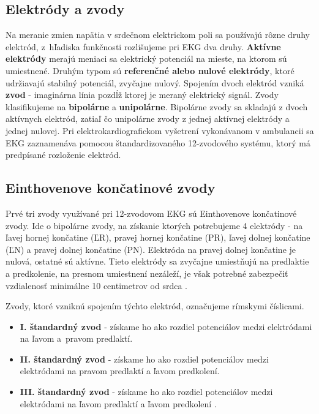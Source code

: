 \subsection{Elektródy a zvody}

Na meranie zmien napätia v srdečnom elektrickom poli sa používajú rôzne druhy elektród, z~hľadiska funkčnosti rozlišujeme pri EKG dva druhy. \textbf{Aktívne elektródy} merajú meniaci sa elektrický potenciál na mieste, na ktorom sú umiestnené. Druhým typom sú \textbf{referenčné alebo nulové elektródy}, ktoré udržiavajú stabilný potenciál, zvyčajne nulový. Spojením dvoch elektród vzniká \textbf{zvod} - imaginárna línia pozdĺž ktorej je meraný elektrický signál. Zvody klasifikujeme na \textbf{bipolárne} a \textbf{unipolárne}. Bipolárne zvody sa skladajú z dvoch aktívnych elektród, zatiaľ čo unipolárne zvody z jednej aktívnej elektródy a jednej nulovej. Pri elektrokardiografickom vyšetrení vykonávanom v ambulancii sa EKG zaznamenáva pomocou štandardizovaného 12-zvodového systému, ktorý má predpísané rozloženie elektród.

\subsection{Einthovenove končatinové zvody}

Prvé tri zvody využívané pri 12-zvodovom EKG sú Einthovenove končatinové zvody. Ide o bipolárne zvody, na získanie ktorých potrebujeme 4 elektródy - na ľavej hornej končatine (ĽR), pravej hornej končatine (PR), ľavej dolnej končatine (ĽN) a pravej dolnej končatine (PN). Elektróda na pravej dolnej končatine je nulová, ostatné sú aktívne. Tieto elektródy sa zvyčajne umiestňujú na predlaktie a predkolenie, na presnom umiestnení nezáleží, je však potrebné zabezpečiť vzdialenosť minimálne 10 centimetrov od srdca \cite{garcia201512}.

\noindent Zvody, ktoré vzniknú spojením týchto elektród, označujeme rímskymi číslicami.

\begin{itemize}
    \item \textbf{I. štandardný zvod} - získame ho ako rozdiel potenciálov medzi elektródami na ľavom a~pravom predlaktí.
    \item \textbf{II. štandardný zvod} - 
    získame ho ako rozdiel potenciálov medzi elektródami na pravom predlaktí a ľavom predkolení.
    \item \textbf{III. štandardný zvod} - 
     získame ho ako rozdiel potenciálov medzi elektródami na ľavom predlaktí a ľavom predkolení \cite{Bada2010}.
\end{itemize}

